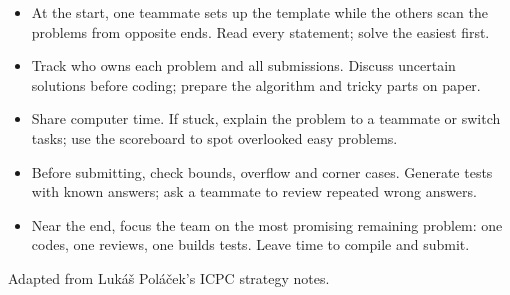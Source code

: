 \begin{itemize}[nosep,leftmargin=*]
\item At the start, one teammate sets up the template while the others scan
the problems from opposite ends. Read every statement; solve the easiest first.
\item Track who owns each problem and all submissions. Discuss uncertain
solutions before coding; prepare the algorithm and tricky parts on paper.
\item Share computer time. If stuck, explain the problem to a teammate or
switch tasks; use the scoreboard to spot overlooked easy problems.
\item Before submitting, check bounds, overflow and corner cases. Generate
tests with known answers; ask a teammate to review repeated wrong answers.
\item Near the end, focus the team on the most promising remaining problem:
one codes, one reviews, one builds tests. Leave time to compile and submit.
\end{itemize}
{\footnotesize Adapted from Luk\'a\v{s} Pol\'a\v{c}ek's ICPC strategy notes.}
